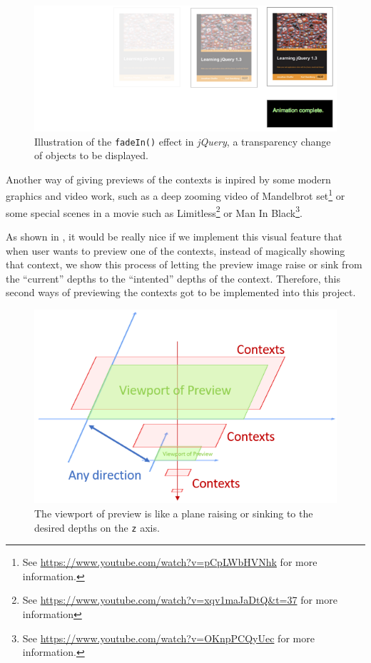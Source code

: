 \begin{figure}[H]
\centering
\includegraphics[width=\textwidth,keepaspectratio]{Figures/Chapter1/jqfadein.png}
\decoRule
\caption[Fade-in Effect in jQuery]{Illustration of the \texttt{fadeIn()} effect in \emph{jQuery}, a transparency change of objects to be displayed.}
\label{fig:jqfadein}
\end{figure}

Another way of giving previews of the contexts is inpired by some modern graphics and video work, such as a deep zooming video of Mandelbrot set\footnote{ See \url{https://www.youtube.com/watch?v=pCpLWbHVNhk} for more information.} or some special scenes in a movie such as Limitless\footnote{ See \url{https://www.youtube.com/watch?v=xqv1maJaDtQ&t=37} for more information} or Man In Black\footnote{ See \url{https://www.youtube.com/watch?v=OKnpPCQyUec} for more information.}.

As shown in , it would be really nice if we implement this visual feature that when user wants to preview one of the contexts, instead of magically showing that context, we show this process of letting the preview image raise or sink from the ``current'' depths to the ``intented'' depths of the context. Therefore, this second ways of previewing the contexts got to be implemented into this project.

\begin{figure}[H]
\centering
\includegraphics[width=.8\textwidth,keepaspectratio]{Figures/Chapter1/zoompreview.png}
\decoRule
\caption[Moving Preview Plane On Context Views]{The viewport of preview is like a plane raising or sinking to the desired depths on the \texttt{z} axis.}
\label{fig:zoompreview}
\end{figure}

